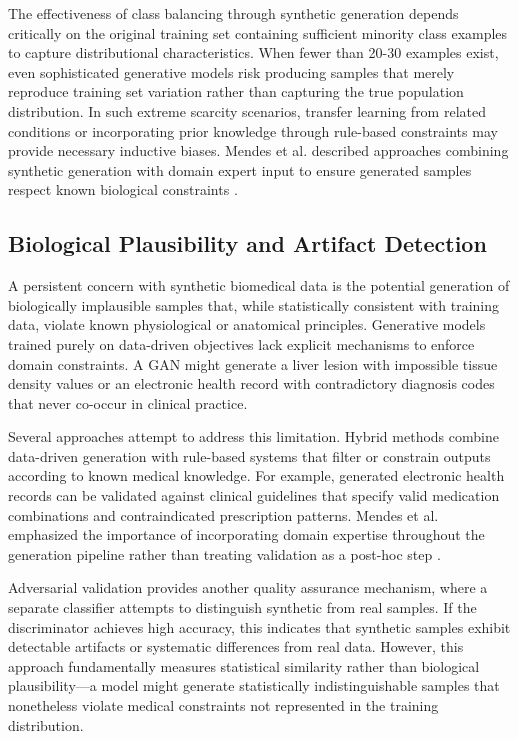 The effectiveness of class balancing through synthetic generation depends critically on the original training set containing sufficient minority class examples to capture distributional characteristics. When fewer than 20-30 examples exist, even sophisticated generative models risk producing samples that merely reproduce training set variation rather than capturing the true population distribution. In such extreme scarcity scenarios, transfer learning from related conditions or incorporating prior knowledge through rule-based constraints may provide necessary inductive biases. Mendes et al. described approaches combining synthetic generation with domain expert input to ensure generated samples respect known biological constraints \cite{mendes2025synthetic}.

\subsection{Biological Plausibility and Artifact Detection}

A persistent concern with synthetic biomedical data is the potential generation of biologically implausible samples that, while statistically consistent with training data, violate known physiological or anatomical principles. Generative models trained purely on data-driven objectives lack explicit mechanisms to enforce domain constraints. A GAN might generate a liver lesion with impossible tissue density values or an electronic health record with contradictory diagnosis codes that never co-occur in clinical practice.

Several approaches attempt to address this limitation. Hybrid methods combine data-driven generation with rule-based systems that filter or constrain outputs according to known medical knowledge. For example, generated electronic health records can be validated against clinical guidelines that specify valid medication combinations and contraindicated prescription patterns. Mendes et al. emphasized the importance of incorporating domain expertise throughout the generation pipeline rather than treating validation as a post-hoc step \cite{mendes2025synthetic}.

Adversarial validation provides another quality assurance mechanism, where a separate classifier attempts to distinguish synthetic from real samples. If the discriminator achieves high accuracy, this indicates that synthetic samples exhibit detectable artifacts or systematic differences from real data. However, this approach fundamentally measures statistical similarity rather than biological plausibility---a model might generate statistically indistinguishable samples that nonetheless violate medical constraints not represented in the training distribution.

